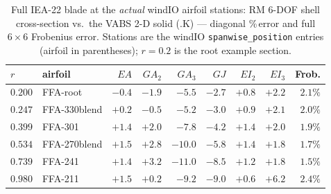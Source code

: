 \begin{table}[t]\centering\small
\caption{Full IEA-22 blade at the \emph{actual} windIO airfoil stations: RM 6-DOF shell cross-section vs.\ the VABS 2-D solid ($.\mathrm{K}$) --- diagonal \%\,error and full $6\times6$ Frobenius error. Stations are the windIO \texttt{spanwise\_position} entries (airfoil in parentheses); $r=0.2$ is the root example section.}\label{tab:fullblade_real}
\begin{tabular}{llrrrrrrr}
\toprule
$r$ & airfoil & $EA$ & $GA_2$ & $GA_3$ & $GJ$ & $EI_2$ & $EI_3$ & Frob.\\
\midrule
$0.200$ & FFA-root & $-0.4$ & $-1.9$ & $-5.5$ & $-2.7$ & $+0.8$ & $+2.2$ & $2.1\%$\\
$0.247$ & FFA-330blend & $+0.2$ & $-0.5$ & $-5.2$ & $-3.0$ & $+0.9$ & $+2.1$ & $2.0\%$\\
$0.399$ & FFA-301 & $+1.4$ & $+2.0$ & $-7.8$ & $-4.2$ & $+1.4$ & $+2.0$ & $1.9\%$\\
$0.534$ & FFA-270blend & $+1.5$ & $+2.8$ & $-10.0$ & $-5.8$ & $+1.4$ & $+1.8$ & $1.7\%$\\
$0.739$ & FFA-241 & $+1.4$ & $+3.2$ & $-11.0$ & $-8.5$ & $+1.2$ & $+1.8$ & $1.5\%$\\
$0.980$ & FFA-211 & $+1.5$ & $+0.2$ & $-9.2$ & $-9.0$ & $+0.6$ & $+6.2$ & $2.4\%$\\
\bottomrule
\end{tabular}
\end{table}